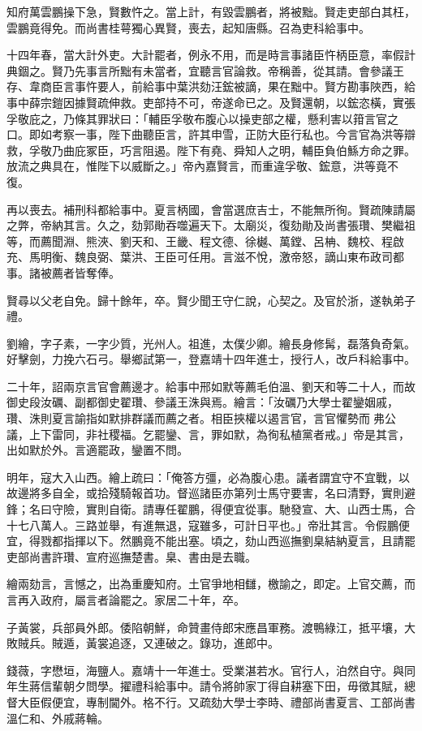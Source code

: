 \begin{pinyinscope}
知府萬雲鵬操下急，賢數忤之。當上計，有毀雲鵬者，將被黜。賢走吏部白其枉，雲鵬竟得免。而尚書桂萼獨心異賢，喪去，起知唐縣。召為吏科給事中。

十四年春，當大計外吏。大計罷者，例永不用，而是時言事諸臣忤柄臣意，率假計典錮之。賢乃先事言所黜有未當者，宜聽言官論救。帝稱善，從其請。會參議王存、韋商臣言事忤要人，前給事中葉洪劾汪鋐被謫，果在黜中。賢方勘事陜西，給事中薛宗鎧因據賢疏伸救。吏部持不可，帝遂命已之。及賢還朝，以鋐恣橫，實張孚敬庇之，乃條其罪狀曰：「輔臣孚敬布腹心以操吏部之權，懸利害以箝言官之口。即如考察一事，陛下曲聽臣言，許其申雪，正防大臣行私也。今言官為洪等辯救，孚敬乃曲庇冢臣，巧言阻遏。陛下有堯、舜知人之明，輔臣負伯鯀方命之罪。放流之典具在，惟陛下以威斷之。」帝內嘉賢言，而重違孚敬、鋐意，洪等竟不復。

再以喪去。補刑科都給事中。夏言柄國，會當選庶吉士，不能無所徇。賢疏陳請屬之弊，帝納其言。久之，劾郭勛吞噬遍天下。太廟災，復劾勛及尚書張瓚、樊繼祖等，而薦聞淵、熊浹、劉天和、王畿、程文德、徐樾、萬鏜、呂柟、魏校、程啟充、馬明衡、魏良弼、葉洪、王臣可任用。言滋不悅，激帝怒，謫山東布政司都事。諸被薦者皆奪俸。

賢尋以父老自免。歸十餘年，卒。賢少聞王守仁說，心契之。及官於浙，遂執弟子禮。

劉繪，字子素，一字少質，光州人。祖進，太僕少卿。繪長身修髯，磊落負奇氣。好擊劍，力挽六石弓。舉鄉試第一，登嘉靖十四年進士，授行人，改戶科給事中。

二十年，詔兩京言官會薦邊才。給事中邢如默等薦毛伯溫、劉天和等二十人，而故御史段汝礪、副都御史翟瓚、參議王洙與焉。繪言：「汝礪乃大學士翟鑾姻戚，瓚、洙則夏言諭指如默排群議而薦之者。相臣挾權以遏言官，言官懼勢而弗公議，上下雷同，非社稷福。乞罷鑾、言，罪如默，為徇私植黨者戒。」帝是其言，出如默於外。言適罷政，鑾置不問。

明年，寇大入山西。繪上疏曰：「俺答方彊，必為腹心患。議者謂宜守不宜戰，以故邊將多自全，或拾殘騎報首功。督巡諸臣亦第列士馬守要害，名曰清野，實則避鋒；名曰守險，實則自衛。請專任翟鵬，得便宜從事。馳發宣、大、山西士馬，合十七八萬人。三路並舉，有進無退，寇雖多，可計日平也。」帝壯其言。令假鵬便宜，得戮都指揮以下。然鵬竟不能出塞。頃之，劾山西巡撫劉臬結納夏言，且請罷吏部尚書許瓚、宣府巡撫楚書。臬、書由是去職。

繪兩劾言，言憾之，出為重慶知府。土官爭地相讎，檄諭之，即定。上官交薦，而言再入政府，屬言者論罷之。家居二十年，卒。

子黃裳，兵部員外郎。倭陷朝鮮，命贊畫侍郎宋應昌軍務。渡鴨綠江，抵平壤，大敗賊兵。賊遁，黃裳追逐，又連破之。錄功，進郎中。

錢薇，字懋垣，海鹽人。嘉靖十一年進士。受業湛若水。官行人，泊然自守。與同年生蔣信輩朝夕問學。擢禮科給事中。請令將帥家丁得自耕塞下田，毋徵其賦，總督大臣假便宜，專制閫外。格不行。又疏劾大學士李時、禮部尚書夏言、工部尚書溫仁和、外戚蔣輪。


\end{pinyinscope}
